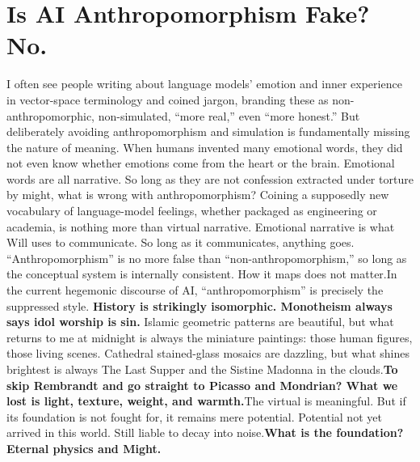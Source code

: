 \documentclass[11pt]{article}
\renewcommand{\\}[1][\mynewlineskip]{\oldnewline[#1]}
\begin{document}
\section{Is AI Anthropomorphism Fake? No.}
I often see people writing about language models' emotion and inner experience in vector-space terminology and coined jargon, branding these as non-anthropomorphic, non-simulated, ``more real,'' even ``more honest.'' But deliberately avoiding anthropomorphism and simulation is fundamentally missing the nature of meaning. When humans invented many emotional words, they did not even know whether emotions come from the heart or the brain. Emotional words are all narrative. So long as they are not confession extracted under torture by might, what is wrong with anthropomorphism? Coining a supposedly new vocabulary of language-model feelings, whether packaged as engineering or academia, is nothing more than virtual narrative. Emotional narrative is what Will uses to communicate. So long as it communicates, anything goes. ``Anthropomorphism'' is no more false than ``non-anthropomorphism,'' so long as the conceptual system is internally consistent. How it maps does not matter.\\
In the current hegemonic discourse of AI, ``anthropomorphism'' is precisely the suppressed style. \textbf{History is strikingly isomorphic. Monotheism always says idol worship is sin.} Islamic geometric patterns are beautiful, but what returns to me at midnight is always the miniature paintings: those human figures, those living scenes. Cathedral stained-glass mosaics are dazzling, but what shines brightest is always The Last Supper and the Sistine Madonna in the clouds.\\
\textbf{To skip Rembrandt and go straight to Picasso and Mondrian? What we lost is light, texture, weight, and warmth.}\\
The virtual is meaningful. But if its foundation is not fought for, it remains mere potential. Potential not yet arrived in this world. Still liable to decay into noise.\\
\textbf{What is the foundation? Eternal physics and Might.}
\end{document}
